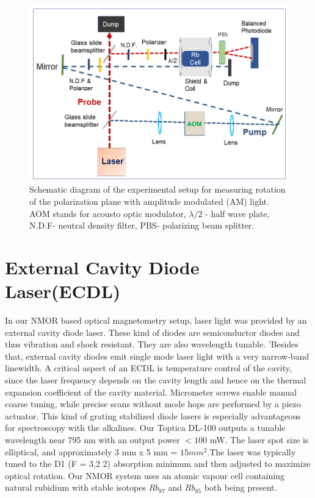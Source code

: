 \begin{figure}[h]
\centering
\includegraphics[width=0.95\linewidth]{figures/experimental_setup}
\caption{Schematic diagram of the experimental setup for measuring
  rotation of the polarization plane with amplitude modulated (AM)
  light. AOM stands for acousto optic modulator, $\lambda/2$ - half
  wave plate, N.D.F- neutral density filter, PBS- polarizing beam
  splitter.}
\end{figure}
\section{External Cavity Diode Laser(ECDL)}
\bigskip
In our NMOR based optical magnetometry setup, laser light was provided by an external cavity diode laser. These kind of diodes are semiconductor diodes and thus vibration and shock resistant. They are also wavelength tunable. ’Besides that, external cavity diodes emit single mode laser light with a very narrow-band linewidth. A critical aspect of an ECDL is temperature control of the cavity, since the laser frequency depends on the cavity length and hence on the thermal expansion coefficient of the cavity material. Micrometer screws enable manual coarse tuning, while precise scans without mode hops are performed by a piezo actuator. This kind of grating stabilized diode lasers is especially advantageous for spectroscopy with the alkalines. Our Toptica DL-100 outputs a tunable wavelength near 795 nm with an output power $<100$ mW. The laser spot size is elliptical, and approximately 3 mm x 5 mm = $15 mm^2$.The laser was typically tuned to the D1 (F = 3,2 2) absorption minimum and then adjusted to maximize optical rotation. Our NMOR system uses an atomic vapour cell containing natural rubidium with stable isotopes $Rb_{87}$ and $Rb_{85}$ both being present.

